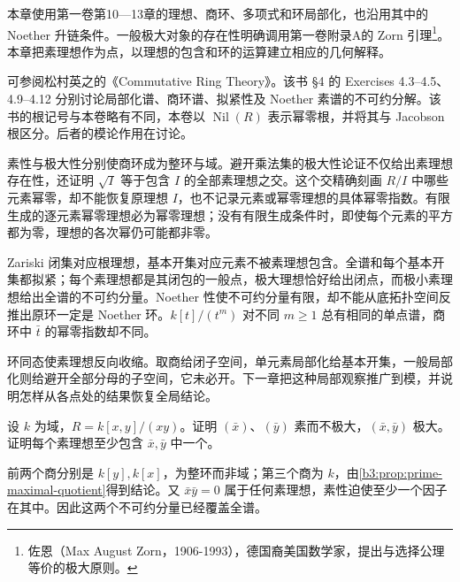 \ProseParagraphBreak

本章使用第一卷第10—13章的理想、商环、多项式和环局部化，也沿用其中的 Noether 升链条件。一般极大对象的存在性明确调用第一卷附录A的 Zorn 引理\footnote{佐恩（Max August Zorn，1906-1993），德国裔美国数学家，提出与选择公理等价的极大原则。}。本章把素理想作为点，以理想的包含和环的运算建立相应的几何解释。

\ProseParagraphBreak
可参阅松村英之的《Commutative Ring Theory》\cite[\S 1, pp. 1--3; \S 4, pp. 24--25]{Matsumura1989CommutativeRingTheory}。该书 \S 4 的 Exercises 4.3--4.5、4.9--4.12 分别讨论局部化谱、商环谱、拟紧性及 Noether 素谱的不可约分解\cite[p. 29]{Matsumura1989CommutativeRingTheory}。该书的根记号与本卷略有不同，本卷以 \(\operatorname{Nil}(R)\) 表示幂零根，并将其与 Jacobson 根区分。后者的模论作用在讨论。






\begin{chaptersummary}
	素性与极大性分别使商环成为整环与域。避开乘法集的极大性论证不仅给出素理想存在性，还证明 \(\sqrt I\) 等于包含 \(I\) 的全部素理想之交。这个交精确刻画 \(R/I\) 中哪些元素幂零，却不能恢复原理想 \(I\)，也不记录元素或幂零理想的具体幂零指数。有限生成的逐元素幂零理想必为幂零理想；没有有限生成条件时，即使每个元素的平方都为零，理想的各次幂仍可能都非零。

	\ProseParagraphBreak
	Zariski 闭集对应根理想，基本开集对应元素不被素理想包含。全谱和每个基本开集都拟紧；每个素理想都是其闭包的一般点，极大理想恰好给出闭点，而极小素理想给出全谱的不可约分量。Noether 性使不可约分量有限，却不能从底拓扑空间反推出原环一定是 Noether 环。\(k[t]/(t^m)\) 对不同 \(m\ge1\) 总有相同的单点谱，商环中 \(\bar t\) 的幂零指数却不同。

	\ProseParagraphBreak
	环同态使素理想反向收缩。取商给闭子空间，单元素局部化给基本开集，一般局部化则给避开全部分母的子空间，它未必开。下一章把这种局部观察推广到模，并说明怎样从各点处的结果恢复全局结论。
\end{chaptersummary}

\BookExercises

\begin{exercise}\label{b3:ex:01-axes-primes}
	设 \(k\) 为域，\(R=k[x,y]/(xy)\)。证明 \((\bar x)\)、\((\bar y)\) 素而不极大，\((\bar x,\bar y)\) 极大。证明每个素理想至少包含 \(\bar x,\bar y\) 中一个。
\end{exercise}
\begin{solution}
	前两个商分别是 \(k[y],k[x]\)，为整环而非域；第三个商为 \(k\)，由\cref{b3:prop:prime-maximal-quotient}得到结论。又 \(\bar x\bar y=0\) 属于任何素理想，素性迫使至少一个因子在其中。因此这两个不可约分量已经覆盖全谱。
\end{solution}

